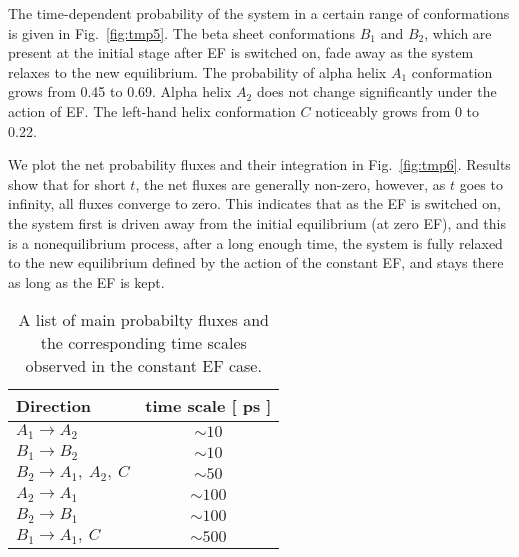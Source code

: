 \documentclass[a4paper,preprint,unsortedaddress,onecolumn]{revtex4-1}
\begin{document}
The time-dependent probability of the system in a certain range of conformations is given in
Fig.~\ref{fig:tmp5}. The beta sheet conformations $B_1$ and $B_2$,
which are present at the initial stage after EF is switched on,
fade away as the system relaxes to the new equilibrium. The
probability of alpha helix $A_1$ conformation grows from 0.45 to 0.69.
Alpha helix $A_2$  does not change significantly  under the action of EF.
The left-hand helix conformation $C$ noticeably grows from 0 to 0.22.

We plot the net probability fluxes and their integration in Fig.~\ref{fig:tmp6}.
Results show that for short $t$, the net fluxes are generally non-zero, however, 
as $t$ goes to infinity,
all fluxes converge to zero. This indicates
that as the EF is switched on, the system first is driven away from the initial
equilibrium (at zero EF), and this is a nonequilibrium process, 
after a long enough time, the system
is fully relaxed to the new equilibrium defined by the action of the constant EF,
and stays there as long as the EF is kept.

\begin{table}
  \centering
  \begin{tabular*}{0.4\textwidth}{@{\extracolsep{\fill}}lc}\hline\hline
    Direction        & time scale [ ps ] \\\hline
    $A_1\rightarrow A_2$        &       $\sim 10$      \\
    $B_1\rightarrow B_2$        &       $\sim 10$      \\    
    $B_2\rightarrow A_1,\ A_2,\ C$        &       $\sim 50$      \\    
    $A_2\rightarrow A_1$        &       $\sim 100$      \\
    $B_2\rightarrow B_1$        &       $\sim 100$      \\    
    $B_1\rightarrow A_1,\ C$        &       $\sim 500$      \\    \hline\hline
  \end{tabular*}
  \caption{A list of main probabilty fluxes and the corresponding time scales observed in the constant EF case.}
  \label{tab:tmp1}
\end{table}
\end{document}
